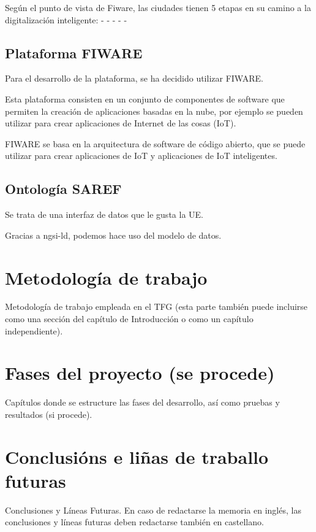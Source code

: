 \documentclass[12pt, a4paper, twoside]{article}
\begin{document}
 Según el punto de vista de Fiware, las ciudades tienen 5 etapas en su camino a la digitalización inteligente:
 - 
 -
 -
 -
 -



  \subsection{Plataforma FIWARE} 
 Para el desarrollo de la plataforma, se ha decidido utilizar FIWARE.
 
Esta plataforma consisten en un conjunto de componentes de software que permiten la creación 
de aplicaciones basadas en la nube, por ejemplo se pueden utilizar para crear aplicaciones de 
Internet de las cosas (IoT). 

FIWARE se basa en la arquitectura de software de código abierto, que se puede utilizar para crear 
aplicaciones de IoT y aplicaciones de IoT inteligentes.

  \subsection{Ontología SAREF}
  Se trata de una interfaz de datos que le gusta la UE.

  Gracias a ngsi-ld, podemos hace uso del modelo de datos.

 \section{Metodología de trabajo}
 Metodología de trabajo empleada en el TFG (esta parte también puede incluirse como una sección del capítulo de Introducción o como un capítulo independiente).

 \section{Fases del proyecto (se procede)}
 Capítulos donde se estructure las fases del desarrollo, así como pruebas y resultados (si procede). 

\section{Conclusións e liñas de traballo futuras}
Conclusiones y Líneas Futuras. En caso de redactarse la memoria en inglés, las conclusiones y líneas futuras deben redactarse también en castellano.
\end{document}

